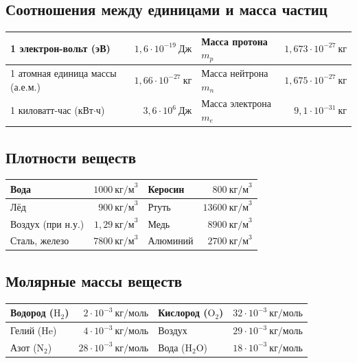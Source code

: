 \subsection*{Соотношения между единицами и масса частиц}
\noindent\begin{tabularx}{\linewidth}{X r || X r}
\hline
1 электрон-вольт (эВ) & $1{,}6 \cdot 10^{-19}~\text{Дж}$ & Масса протона $m_p$ & $1{,}673 \cdot 10^{-27}~\text{кг}$ \\ \hline
1 атомная единица массы (а.е.м.) & $1{,}66 \cdot 10^{-27}~\text{кг}$ & Масса нейтрона $m_n$ & $1{,}675 \cdot 10^{-27}~\text{кг}$ \\ \hline
1 киловатт-час (кВт$\cdot$ч) & $3{,}6 \cdot 10^6~\text{Дж}$ & Масса электрона $m_e$ & $9{,}1 \cdot 10^{-31}~\text{кг}$ \\ \hline
\end{tabularx}

\subsection*{Плотности веществ}
\noindent\begin{tabularx}{\linewidth}{X r || X r}
\hline
Вода & $1000~\text{кг/м}^3$ & Керосин & $800~\text{кг/м}^3$ \\ \hline
Лёд & $900~\text{кг/м}^3$   & Ртуть & $13600~\text{кг/м}^3$ \\ \hline
Воздух (при н.у.) & $1{,}29~\text{кг/м}^3$ & Медь & $8900~\text{кг/м}^3$ \\ \hline
Сталь, железо & $7800~\text{кг/м}^3$ & Алюминий & $2700~\text{кг/м}^3$ \\ \hline
\end{tabularx}

\subsection*{Молярные массы веществ}
\noindent\begin{tabularx}{\linewidth}{X r || X r}
\hline
Водород ($\text{H}_2$) & $2 \cdot 10^{-3}~\text{кг/моль}$ & Кислород ($\text{O}_2$) & $32 \cdot 10^{-3}~\text{кг/моль}$ \\ \hline
Гелий ($\text{He}$) & $4 \cdot 10^{-3}~\text{кг/моль}$ & Воздух & $29 \cdot 10^{-3}~\text{кг/моль}$ \\ \hline
Азот ($\text{N}_2$) & $28 \cdot 10^{-3}~\text{кг/моль}$ & Вода ($\text{H}_2\text{O}$) & $18 \cdot 10^{-3}~\text{кг/моль}$ \\ \hline
\end{tabularx}

